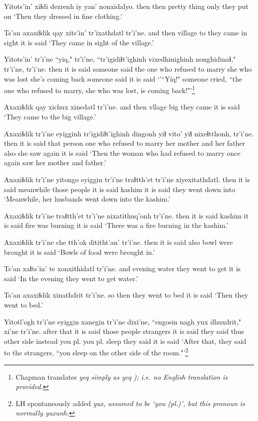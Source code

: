 \documentclass[12pt]{article}
\begin{document}
\gll Yitots'in' xiɬdi {dezrenh iy} yan' nonxidalyo.
then  then {pretty thing} only {they put on}
\glt `Then they dressed in fine clothing.'
\glend

\gll Ts'an axaxiɬdik qay xits'in' tr'ixathdatl  tr'i'ne.
and then  village to {they came in sight} {it is said}
\glt `They came in sight of the village.'
\glend

\gll Yitots'in' tr'i'ne ``yiq," tr'i'ne, ``tr'igidiɬt'ighinh   vixedhinighinh nonghidinaɬ," tr'i'ne, tr'i'ne.
then  {it is said} {}  {someone said} {the one who refused to marry} {she who was lost} {she's coming back} {someone said} {it is said}
\glt `'``Yiq!" someone cried, ``the one who refused to marry, she who was lost, is coming back!"'\footnote{Chapman translates \em yeq simply as \em yeq \em ); i.e. no English translation is provided.}
\glend

\gll Axaxiɬdik qay xichux xinedatl tr'i'ne.
{and then} vllage big {they came} {it is said}
\glt `They came to the big village.'
\glend

\gll Axaxiɬdik tr'i'ne eyigginh tr'igidiɬt'ighinh dingonh yiɬ vito'  yiɬ nixeɬtthonh, tr'i'ne.
then  {it is said} {that person} {one who refused to marry} {her mother} and {her father} also {she saw again}  {it is said}
\glt `Then the woman who had refused to marry once again saw her mother and father.'
\glend

\gll Axaxiɬdik tr'i'ne yitongo eyiggin tr'i'ne traɬtth'et tr'i'ne xiyexitathdatl.
then  {it is said} meanwhile {those people} {it is said} kashim  {it is said} {they went down into}
\glt `Meanwhile, her husbands went down into the kashim.'
\glend

\gll Axaxiɬdik tr'i'ne traɬtth'et tr'i'ne nixatithuq'onh tr'i'ne.
then  {it is said} kashim  {it is said} {fire was burning} {it is said}
\glt `There was a fire burning in the kashim.'
\glend

\gll Axaxiɬdik tr'i'ne che tth'ok  dititht'an' tr'i'ne.
then  {it is said} also bowl {were brought} {it is said}
\glt `Bowls of food were brought in.'
\glend

\gll Ts'an xaɬts'in' te xonxithidatl tr'i'ne.
and evening water {they went to get} {it is said}
\glt `In the evening they went to get water.'
\glend

\gll Ts'an axaxiɬdik xinathdrit  tr'i'ne.
so then {they went to bed} {it is said}
\glt `Then they went to bed.'
\glend

\gll Yitotl'ogh tr'i'ne eyiggin xanegin tr'i'ne dixi'ne, ``engosin nagh yux dhuxdrit," xi'ne tr'i'ne.
{after that} {it is said} {those people} strangers {it is said} {they said thus} {other side} instead {you pl.} {you pl. sleep} {they said} {it is said}
\glt `After that, they said to the strangers, ``you sleep on the other side of the room."'\footnote{LH spontaneously added \em yux, \em assumed to be `you (pl.)', but this pronoun is normally \em yuxunh.}
\glend
\end{document}
